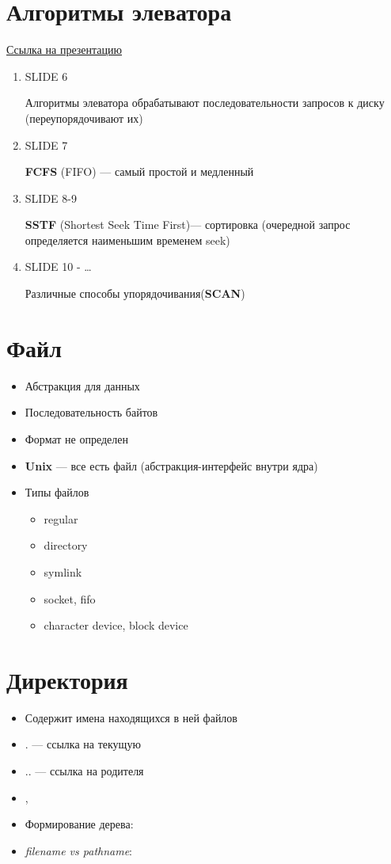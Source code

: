 \documentclass[../lectures.tex]{subfiles}
\begin{document}
\section{Алгоритмы элеватора}
\textcolor{blue}{\href{https://slideplayer.com/slide/5209336}{Ссылка на презентацию}}
\begin{enumerate}
    \item SLIDE 6
        
          Алгоритмы элеватора обрабатывают последовательности запросов к диску (переупорядочивают их)
    \item SLIDE 7

          \textbf{FCFS} (FIFO) --- самый простой и медленный
    \item SLIDE 8-9

          \textbf{SSTF} (Shortest Seek Time First)--- сортировка (очередной запрос определяется наименьшим временем seek)
    \item SLIDE 10 - \dots

          Различные способы упорядочивания(\textbf{SCAN})
\end{enumerate}

\section{Файл}
\begin{itemize}
    \item Абстракция для данных
    \item Последовательность байтов
    \item Формат не определен
    \item \textbf{Unix} --- все есть файл (абстракция-интерфейс внутри ядра)
    \item Типы файлов 
          \begin{itemize}
            \item regular
            \item directory
            \item symlink
            \item socket, fifo
            \item character device, block device
          \end{itemize}
\end{itemize}

\section{Директория}
\begin{itemize}
    \item Содержит имена находящихся в ней файлов
    \item $.$ --- ссылка на текущую
    \item $..$ --- ссылка на родителя
    \item {}, 
    \item Формирование дерева: 
    \item \emph{filename vs pathname}: 
\end{itemize}
\end{document}
